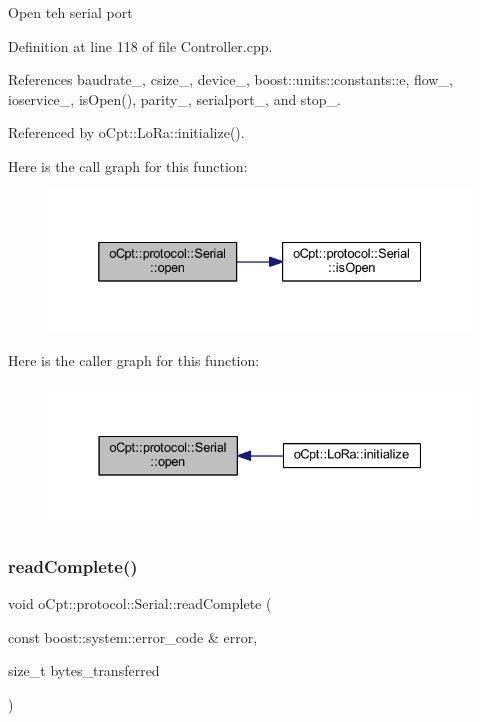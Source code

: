 Open teh serial port 

Definition at line 118 of file Controller.\+cpp.



References baudrate\+\_\+, csize\+\_\+, device\+\_\+, boost\+::units\+::constants\+::e, flow\+\_\+, ioservice\+\_\+, is\+Open(), parity\+\_\+, serialport\+\_\+, and stop\+\_\+.



Referenced by o\+Cpt\+::\+Lo\+Ra\+::initialize().

Here is the call graph for this function\+:\nopagebreak
\begin{figure}[H]
\begin{center}
\leavevmode
\includegraphics[width=332pt]{classo_cpt_1_1protocol_1_1_serial_a7738b1566f37b36c97055a8800482a10_cgraph}
\end{center}
\end{figure}
Here is the caller graph for this function\+:\nopagebreak
\begin{figure}[H]
\begin{center}
\leavevmode
\includegraphics[width=331pt]{classo_cpt_1_1protocol_1_1_serial_a7738b1566f37b36c97055a8800482a10_icgraph}
\end{center}
\end{figure}
\hypertarget{classo_cpt_1_1protocol_1_1_serial_ac7d84ba0853d120852157c490bdcd097}{}\label{classo_cpt_1_1protocol_1_1_serial_ac7d84ba0853d120852157c490bdcd097} 
\subsubsection{\texorpdfstring{read\+Complete()}{readComplete()}}
{\footnotesize\ttfamily void o\+Cpt\+::protocol\+::\+Serial\+::read\+Complete (\begin{DoxyParamCaption}\item[{const boost\+::system\+::error\+\_\+code \&}]{error,  }\item[{size\+\_\+t}]{bytes\+\_\+transferred }\end{DoxyParamCaption})\hspace{0.3cm}{\ttfamily [protected]}}

